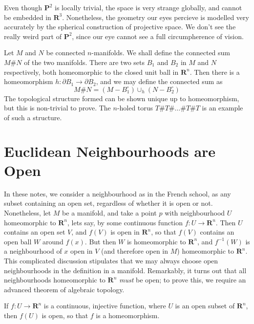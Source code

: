 Even though $\mathbf{P}^2$ is locally trivial, the space is very strange globally, and cannot be embedded in $\mathbf{R}^3$. Nonetheless, the geometry our eyes percieve is modelled very accurately by the spherical construction of projective space. We don't see the really weird part of $\mathbf{P}^2$, since our eye cannot see a full circumpherence of vision.

\begin{example}
    Let $M$ and $N$ be connected $n$-manifolds. We shall define the connected sum $M \# N$ of the two manifolds. There are two sets $B_1$ and $B_2$ in $M$ and $N$ respectively, both homeomorphic to the closed unit ball in $\mathbf{R}^n$. Then there is a homeomorphism $h:\partial B_1 \to \partial B_2$, and we may define the connected sum as
    \[ M \# N = (M - B_1^\circ) \cup_h (N - B_2^\circ) \]
    The topological structure formed can be shown unique up to homeomorphism, but this is non-trivial to prove. The $n$-holed torus $T \# T \# \dots \# T \# T$ is an example of such a structure.
\end{example}

\section{Euclidean Neighbourhoods are Open}

In these notes, we consider a neighbourhood as in the French school, as any subset containing an open set, regardless of whether it is open or not. Nonetheless, let $M$ be a manifold, and take a point $p$ with neighbourhood $U$ homeomorphic to $\mathbf{R}^n$, lets say, by some continuous function $f: U \to \mathbf{R}^n$. Then $U$ contains an open set $V$, and $f(V)$ is open in $\mathbf{R}^n$, so that $f(V)$ contains an open ball $W$ around $f(x)$. But then $W$ is homeomorphic to $\mathbf{R}^n$, and $f^{-1}(W)$ is a neighbourhood of $x$ open in $V$ (and therefore open in $M$) homeomorphic to $\mathbf{R}^n$. This complicated discussion stipulates that we may always choose open neighbourhoods in the definition in a manifold. Remarkably, it turns out that all neighbourhoods homeomorphic to $\mathbf{R}^n$ {\it must} be open; to prove this, we require an advanced theorem of algebraic topology.


\begin{theorem}
    If $f:U \to \mathbf{R}^n$ is a continuous, injective function, where $U$ is an open subset of $\mathbf{R}^n$, then $f(U)$ is open, so that $f$ is a homeomorphism.
\end{theorem}


